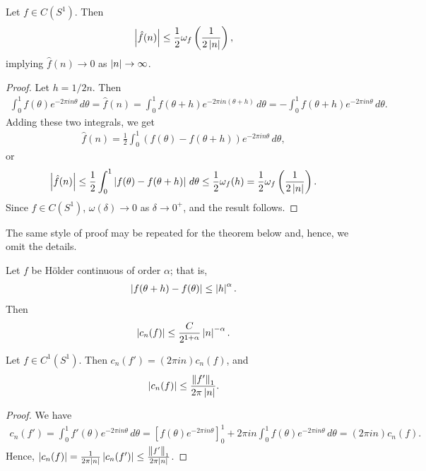 \begin{theorem}
    Let $f \in C(S^{1})$. Then
    \begin{align}
        \left| \hat{f}(n) \right| \leq \frac{1}{2}\omega_{f}\left( \frac{1}{2\left| n \right|} \right),
    \end{align}
    implying $\hat{f}(n) \to 0$ as $\left| n \right| \to \infty$.
\end{theorem}
\begin{proof}
    Let $h = 1/2n$. Then
    \begin{align}
        \int_{0}^{1}f(\theta)e^{-2\pi i n \theta} \, d\theta = \hat{f}(n) = \int_{0}^{1}f(\theta+h)e^{-2\pi i n(\theta+h)} \, d\theta = -\int_{0}^{1}f(\theta+h)e^{-2\pi i n \theta} \, d\theta.
    \end{align}
    Adding these two integrals, we get
    \begin{align}
        \hat{f}(n) = \frac{1}{2} \int_{0}^{1} \left(f(\theta)-f(\theta+h)\right)e^{-2\pi i n \theta} \, d\theta,
    \end{align}
    or
    \begin{align}
        \left| \hat{f}(n) \right| \leq \frac{1}{2} \int_{0}^{1} \left| f(\theta)-f(\theta+h) \right| \, d\theta \leq \frac{1}{2}\omega_{f}(h) = \frac{1}{2}\omega_{f}\left( \frac{1}{2\left| n \right|} \right).
    \end{align}
    Since $f \in C(S^{1})$, $\omega(\delta) \to 0$ as $\delta \to 0^{+}$, and the result follows.
\end{proof}

The same style of proof may be repeated for the theorem below and, hence, we omit the details.

\begin{theorem}
    Let $f$ be H\"older continuous of order $\alpha$; that is,
    \begin{align}
        \left| f(\theta+h)-f(\theta) \right| \leq \left| h \right|^{\alpha}.
    \end{align}
    Then
    \begin{align}
        \left| c_{n}(f) \right| \leq \frac{C}{2^{1+\alpha}}\left| n \right|^{-\alpha}.
    \end{align}
\end{theorem}

\begin{theorem}
    Let $f \in C^{1}(S^{1})$. Then $c_{n}(f') = (2 \pi i n)c_{n}(f)$, and
    \begin{align}
        \left| c_{n}(f) \right| \leq \frac{\left\lVert f'\right\rVert_{1}}{2\pi\left| n \right|}.
    \end{align}
\end{theorem}
\begin{proof}
    We have
    \begin{align}
        c_{n}(f') = \int_{0}^{1} f'(\theta)e^{-2\pi i n \theta} \, d\theta = \left[f(\theta)e^{-2\pi i n \theta}\right]_{0}^{1} + 2\pi i n \int_{0}^{1} f(\theta)e^{-2\pi i n \theta} \, d\theta = (2\pi i n)c_{n}(f).
    \end{align}
    Hence, $\left| c_{n}(f) \right| = \frac{1}{2\pi\left| n \right|}\left| c_{n}(f') \right| \leq \frac{\left\lVert f'\right\rVert_{1}}{2\pi\left| n \right|}$.
\end{proof}

